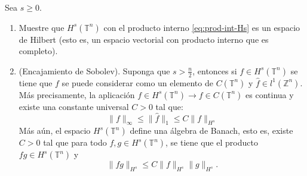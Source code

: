     \begin{theorem}
      Sea $s\geq 0$.
      \begin{enumerate}
        \item Muestre que $H^s(\mathbb{T}^{n})$ con el producto interno \textcolor{red}{\ref{eq:prod-int-Hs}} es un espacio de Hilbert (esto es, un espacio vectorial con producto interno que es completo).
        \item (Encajamiento de Sobolev). Suponga que $s > \frac{n}{2}$, entonces si $f \in H^s(\mathbb{T}^{n})$ se tiene que $f$ se puede considerar como un elemento de $C(\mathbb{T}^{n})$ y $\hat{f} \in l^1(\mathbb{Z}^{n})$. Más precisamente, la aplicación $f \in H^s(\mathbb{T}^{n}) \to f \in C(\mathbb{T}^{n})$ es continua y existe una constante universal $C>0$ tal que:
        \begin{equation}
          \|f\|_{\infty}\leq \|\hat{f}\|_{1}\leq C\|f\|_{H^s}\label{eq:2-33}
        \end{equation}
        Más aún, el espacio $H^{s}(\mathbb{T}^{n})$ define una álgebra de Banach, esto es, existe $C > 0$  tal que para todo $f,g \in H^s(\mathbb{T}^{n})$, se tiene que el producto $fg \in H^s(\mathbb{T}^{n})$ y
        \begin{equation}
          \|fg\|_{H^s}\leq C\|f\|_{H^s}\|g\|_{H^s}.\label{eq:2-34}
        \end{equation}
      \end{enumerate}
    \end{theorem}

